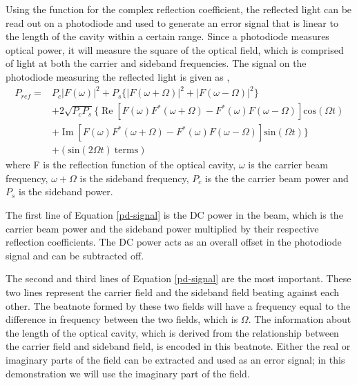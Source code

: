 Using the function for the complex reflection coefficient, the reflected light 
can be read out on a photodiode and used to generate an 
error signal that is linear to the length of the cavity within a certain range.
Since a photodiode measures optical power, it will measure the square of the 
optical field, which is comprised of light at both the carrier and sideband 
frequencies.  
The signal on the photodiode measuring the reflected light is given as \cite{Black01},
\begin{equation}
\begin{split}
P_{ref} = & P_c\lvert F(\omega) \rvert^2 + P_s\{\lvert F(\omega + \Omega) \rvert^2 
          + \lvert F(\omega - \Omega) \rvert^2\} \\
          & + 2\sqrt{P_{c}P_{s}}\{\operatorname{Re}[F(\omega)F^*(\omega + \Omega) - F^*(\omega)F(\omega - \Omega)]
            \mathrm{cos}(\Omega t) \\ 
          & + \operatorname{Im}[F(\omega)F^*(\omega + \Omega) - F^*(\omega)F(\omega - \Omega)]\mathrm{sin}(\Omega t)\} \\
          & + (\mathrm{sin}(2\Omega t)~\mathrm{terms})
\end{split}
\label{pd-signal}
\end{equation}
where F is the reflection function of the optical cavity, 
$\omega$ is the carrier beam frequency, $\omega + \Omega$ is the sideband
frequency, $P_{c}$ is the the carrier beam power and $P_{s}$ is the
sideband power.

The first line of Equation \ref{pd-signal} is the DC power in the beam, which is 
the carrier beam power and the sideband power multiplied by their respective 
reflection coefficients. The DC power acts as an overall offset in the photodiode signal 
and can be subtracted off. 

The second and third lines of Equation \ref{pd-signal} are 
the most important. These two lines represent the carrier field and the sideband field 
beating against each other. The beatnote formed by these two fields will have a frequency 
equal to the difference in frequency between the two fields, which is $\Omega$. 
The information about the length of the optical cavity, which is derived from the 
relationship between the carrier field and sideband field, is encoded in this beatnote.
Either the real or imaginary parts of the field can be extracted and used as an error signal; 
in this demonstration we will use the imaginary part of the field. 

